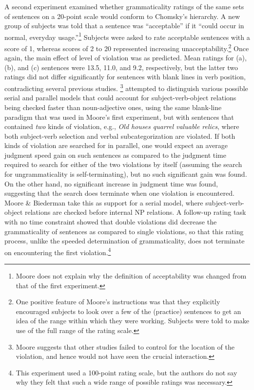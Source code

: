 A second experiment examined whether grammaticality ratings of the same sets of sentences on a 20-point scale would conform to Chomsky's hierarchy. A new group of subjects was told that a sentence was ``acceptable'' if it ``could occur in normal, everyday usage.''\footnote{Moore does not explain why the definition of acceptability was changed from that of the first experiment.}
 Subjects were asked to rate acceptable sentences with a score of  1, whereas scores of 2 to 20 represented increasing unacceptability.\footnote{One positive feature of Moore's instructions was that they explicitly encouraged subjects to look over a few of the (practice) sentences to get an idea of the range within which they were working. Subjects were told to make use of the full range of the rating scale.}
 Once again, the main effect of level of violation was as predicted. Mean ratings for (a), (b), and (c) sentences were 13.5, 11.0, and 9.2, respectively, but the latter two ratings did not differ significantly for sentences with blank lines in verb position, contradicting  several previous studies. 
\footnote{Moore suggests that other studies failed to control for the location of the violation, and hence would not have seen the crucial interaction.}
 \citet{MooreEtAl1979}
attempted to distinguish various possible serial and parallel models that could account for subject-verb-object relations being  checked faster than noun-adjective ones, using the same blank-line paradigm that was used in Moore's first experiment, but with sentences that contained \textit{two} kinds of violation, e.g., \textit{Old houses quarrel valuable relics}, where both subject-verb selection and verbal subcategorization  are violated. If both kinds of violation  are searched for in parallel, one
would expect an average judgment speed gain on such sentences as compared to the judgment time required to search for either of the two violations by itself (assuming the search for ungrammaticality is self-terminating), but no such significant gain was found. On the other hand, no significant increase in judgment time was found, suggesting that the search does terminate when one violation is encountered. Moore \& Biederman take this as support for a serial model, where subject-verb-object relations are checked before internal NP relations. A follow-up rating task with no time constraint showed that double violations did decrease the grammaticality of sentences as compared to single violations, so that this rating process, unlike the speeded determination of grammaticality, does not terminate on encountering the first violation.\footnote{This experiment used a 100-point rating scale, but the authors do not say why they felt that such a wide range of possible ratings was necessary.
}


